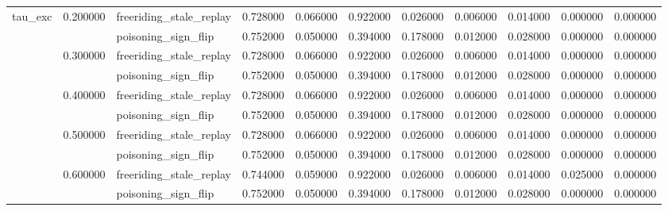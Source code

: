 \begin{tabular}{lllrrrrrrrr}
\cline{1-11} \cline{2-11}
\multirow[t]{10}{*}{tau_exc} & \multirow[t]{2}{*}{0.200000} & freeriding_stale_replay & 0.728000 & 0.066000 & 0.922000 & 0.026000 & 0.006000 & 0.014000 & 0.000000 & 0.000000 \\
 &  & poisoning_sign_flip & 0.752000 & 0.050000 & 0.394000 & 0.178000 & 0.012000 & 0.028000 & 0.000000 & 0.000000 \\
\cline{2-11}
 & \multirow[t]{2}{*}{0.300000} & freeriding_stale_replay & 0.728000 & 0.066000 & 0.922000 & 0.026000 & 0.006000 & 0.014000 & 0.000000 & 0.000000 \\
 &  & poisoning_sign_flip & 0.752000 & 0.050000 & 0.394000 & 0.178000 & 0.012000 & 0.028000 & 0.000000 & 0.000000 \\
\cline{2-11}
 & \multirow[t]{2}{*}{0.400000} & freeriding_stale_replay & 0.728000 & 0.066000 & 0.922000 & 0.026000 & 0.006000 & 0.014000 & 0.000000 & 0.000000 \\
 &  & poisoning_sign_flip & 0.752000 & 0.050000 & 0.394000 & 0.178000 & 0.012000 & 0.028000 & 0.000000 & 0.000000 \\
\cline{2-11}
 & \multirow[t]{2}{*}{0.500000} & freeriding_stale_replay & 0.728000 & 0.066000 & 0.922000 & 0.026000 & 0.006000 & 0.014000 & 0.000000 & 0.000000 \\
 &  & poisoning_sign_flip & 0.752000 & 0.050000 & 0.394000 & 0.178000 & 0.012000 & 0.028000 & 0.000000 & 0.000000 \\
\cline{2-11}
 & \multirow[t]{2}{*}{0.600000} & freeriding_stale_replay & 0.744000 & 0.059000 & 0.922000 & 0.026000 & 0.006000 & 0.014000 & 0.025000 & 0.000000 \\
 &  & poisoning_sign_flip & 0.752000 & 0.050000 & 0.394000 & 0.178000 & 0.012000 & 0.028000 & 0.000000 & 0.000000 \\
\cline{1-11} \cline{2-11}
\bottomrule
\end{tabular}
